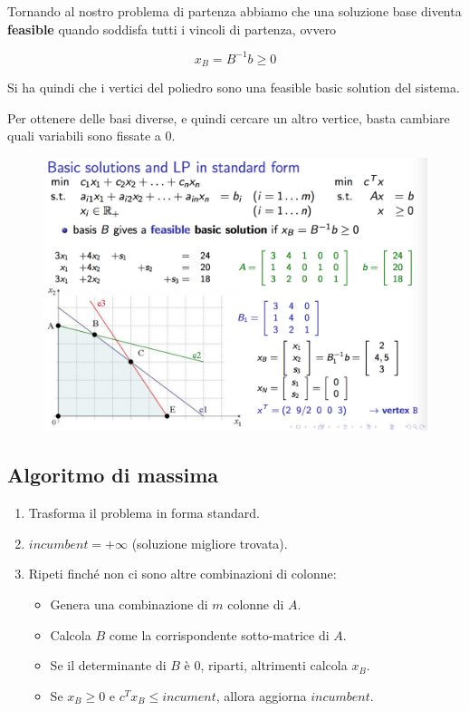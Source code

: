 Tornando al nostro problema di partenza abbiamo che una soluzione base diventa \textbf{feasible} quando soddisfa tutti i vincoli di partenza, ovvero

$$
x_B = B^{-1}b \geq 0
$$

\noindent Si ha quindi che i vertici del poliedro sono una feasible basic solution del sistema.

Per ottenere delle basi diverse, e quindi cercare un altro vertice, basta cambiare quali variabili sono fissate a 0.

\begin{figure}[htbp]
	\centering
	\includegraphics[width=.7\textwidth]{images/l9-fig-2.png}
\end{figure}

\subsection{Algoritmo di massima}

\begin{enumerate}
	\item Trasforma il problema in forma standard.
	\item $incumbent = +\infty$ (soluzione migliore trovata).
	\item Ripeti finché non ci sono altre combinazioni di colonne:
	\begin{itemize}
		\item Genera una combinazione di $m$ colonne di $A$.
		\item Calcola $B$ come la corrispondente sotto-matrice di $A$.
		\item Se il determinante di $B$ è 0, riparti, altrimenti calcola $x_B$.
		\item Se $x_B \geq 0$ e $c^Tx_B \leq incument$, allora aggiorna $incumbent$. 
	\end{itemize}
\end{enumerate}

